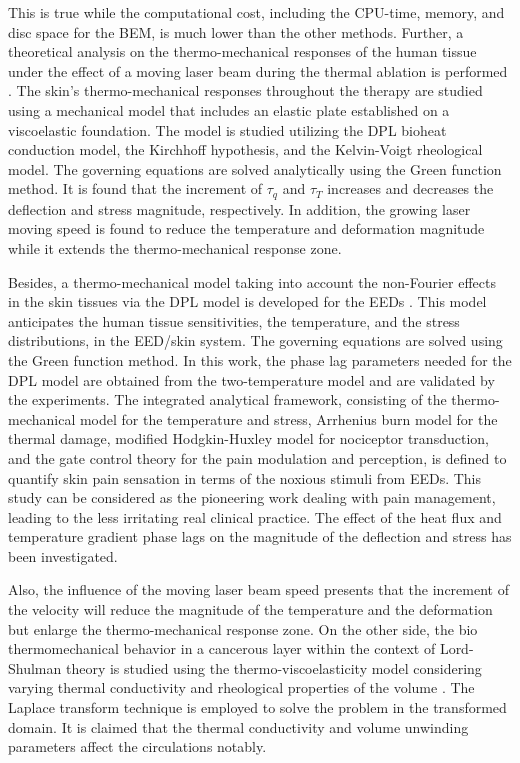 \documentclass[sn-mathphys]{sn-jnl}%
\theoremstyle{thmstyleone}%
\theoremstyle{thmstyletwo}%
\theoremstyle{thmstylethree}%
\begin{document}
{This is true while the computational cost, including the CPU-time, memory, and disc space for the BEM, is much lower than the other methods. Further, a theoretical analysis on the thermo-mechanical responses of the human tissue under the effect of a moving laser beam during the thermal ablation is performed \cite{Ma2019}. The skin's thermo-mechanical responses throughout the therapy are studied using a mechanical model that includes an elastic plate established on a viscoelastic foundation. The model is studied utilizing the DPL bioheat conduction model, the Kirchhoff hypothesis, and the Kelvin-Voigt rheological model. The governing equations are solved analytically using the Green function method. It is found that the increment of $\tau_q$ and $\tau_T$ increases and decreases the deflection and stress magnitude, respectively. In addition, the growing laser moving speed is found to reduce the temperature and deformation magnitude while it extends the thermo-mechanical response zone.

Besides, a thermo-mechanical model taking into account the non-Fourier effects in the skin tissues via the DPL model is developed for the EEDs \cite{YYin2020}. This model anticipates the human tissue sensitivities, the temperature, and the stress distributions, in the EED/skin system. The governing equations are solved using the Green function method. In this work, the phase lag parameters needed for the DPL model are obtained from the two-temperature model and are validated by the experiments. The integrated analytical framework, consisting of the thermo-mechanical model for the temperature and stress, Arrhenius burn model for the thermal damage, modified Hodgkin-Huxley model for nociceptor transduction, and the gate control theory for the pain modulation and perception, is defined to quantify skin pain sensation in terms of the noxious stimuli from EEDs. This study can be considered as the pioneering work dealing with pain management, leading to the less irritating real clinical practice. The effect of the heat flux and temperature gradient phase lags on the magnitude of the deflection and stress has been investigated.

Also, the influence of the moving laser beam speed presents that the increment of the velocity will reduce the magnitude of the temperature and the deformation but enlarge the thermo-mechanical response zone. On the other side, the bio thermomechanical behavior in a cancerous layer within the context of Lord-Shulman theory is studied using the thermo-viscoelasticity model considering varying thermal conductivity and rheological properties of the volume \cite{Ezzat2020}. The Laplace transform technique is employed to solve the problem in the transformed domain. It is claimed that the thermal conductivity and volume unwinding parameters affect the circulations notably.

}
\end{document}
